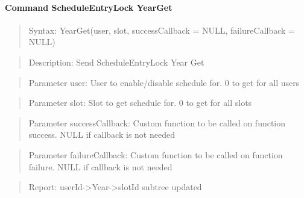 \paragraph{Command ScheduleEntryLock YearGet}
\begin{quote}Syntax: YearGet(user, slot, successCallback = NULL, failureCallback = NULL)\end{quote}
\begin{quote}Description: Send ScheduleEntryLock Year Get\end{quote}
\begin{quote}Parameter user: User to enable/disable schedule for. 0 to get for all users\end{quote}
\begin{quote}Parameter slot: Slot to get schedule for. 0 to get for all slots\end{quote}
\begin{quote}Parameter successCallback: Custom function to be called on function success. NULL if callback is not needed\end{quote}
\begin{quote}Parameter failureCallback: Custom function to be called on function failure. NULL if callback is not needed\end{quote}
\begin{quote}Report: userId->Year->slotId subtree updated\end{quote}

